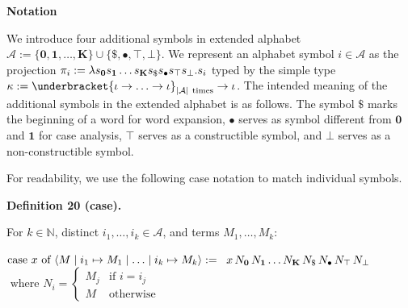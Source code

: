 \documentclass[10pt,a4paper]{amsart}
\begin{document}
 
 
\par\medskip\noindent\textbf{Notation}\par
 
 
We introduce four additional symbols in extended alphabet $\mathcal{A}:=\{\mathbf{0},\mathbf{1},\ldots,\mathbf{K}\}\cup\{\$,\bullet,\top,\bot\}$. We represent an alphabet symbol $i\in\mathcal{A}$ as the projection $\pi_{i}:=\lambda s_{\mathbf{0}}s_{\mathbf{1}}\ldots s_{\mathbf{K}}s_{\$}s_{%
\bullet}s_{\top}s_{\bot}.s_{i}$ typed by the simple type $\kappa:=\underbracket{\iota\to\ldots\to\iota}_{|\mathcal{A}|\leavevmode%
\nobreak\ \text{times}}\to\iota$. The intended meaning of the additional symbols in the extended alphabet is as follows. The symbol $\$$ marks the beginning of a word for word expansion, $\bullet$ serves as symbol different from $\mathbf{0}$ and $\mathbf{1}$ for case analysis, $\top$ serves as a constructible symbol, and $\bot$ serves as a non-constructible symbol.\par
 
 
 
For readability, we use the following case notation to match individual symbols.\par
 
 
 
\par\medskip\noindent\textbf{Definition 20 (case).}\par
 
 
For $k\in\mathbb{N}$, distinct $i_{1},\ldots,i_{k}\in\mathcal{A}$, and terms $M_{1},\ldots,M_{k}$:\par
    $\displaystyle\textnormal{{case }}{x}\textnormal{{ of }}\langle M\mid i_{1}%
\mapsto M_{1}\mid\ldots\mid i_{k}\mapsto M_{k}\rangle:=$ $\displaystyle\leavevmode\nobreak\ x\,N_{\mathbf{0}}\,N_{\mathbf{1}}\ldots N_{%
\mathbf{K}}\,N_{\$}\,N_{\bullet}\,N_{\top}\,N_{\bot}$      $\displaystyle\text{ where }N_{i}=\begin{cases}M_{j}&\text{if }i=i_{j}\\
M&\text{otherwise}\end{cases}$    
 
 
\end{document}
